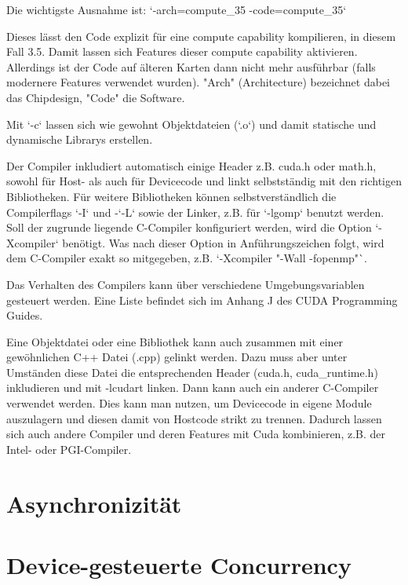 		Die wichtigste Ausnahme ist: \li`-arch=compute_35 -code=compute_35`
		
		Dieses lässt den Code explizit für eine \gls{compute capability} kompilieren, in diesem Fall 3.5. Damit lassen sich Features dieser \gls{compute capability} aktivieren. Allerdings ist der Code auf älteren Karten dann nicht mehr ausführbar (falls modernere Features verwendet wurden). "Arch" (Architecture) bezeichnet dabei das Chipdesign, "Code" die Software.
		
		Mit \li`-c` lassen sich wie gewohnt Objektdateien (\li`.o`) und damit statische und dynamische Librarys erstellen.
		
		Der Compiler inkludiert automatisch einige Header z.B. cuda.h oder math.h, sowohl für Host- als auch für Devicecode und linkt selbstständig mit den richtigen Bibliotheken. Für weitere Bibliotheken können selbstverständlich die Compilerflags \li`-I` und -\li`-L` sowie der Linker, z.B. für \li`-lgomp` benutzt werden.
		Soll der zugrunde liegende C-Compiler konfiguriert werden, wird die Option \li`-Xcompiler` benötigt. Was nach dieser Option in Anführungszeichen folgt, wird dem C-Compiler exakt so mitgegeben, z.B. \li`-Xcompiler "-Wall -fopenmp"`.
		
		Das Verhalten des Compilers kann über verschiedene Umgebungsvariablen gesteuert werden. Eine Liste befindet sich im Anhang J des CUDA Programming Guides. \autocite{cudaPG} 
		
		Eine Objektdatei oder eine Bibliothek kann auch zusammen mit einer gewöhnlichen C++ Datei (.cpp) gelinkt werden. Dazu muss aber unter Umständen diese Datei die entsprechenden Header (cuda.h, cuda{\_}runtime.h) inkludieren und mit -lcudart linken. Dann kann auch ein anderer C-Compiler verwendet werden. Dies kann man nutzen, um Devicecode in eigene Module auszulagern und diesen damit von Hostcode strikt zu trennen. Dadurch lassen sich auch andere Compiler und deren Features mit Cuda kombinieren, z.B. der Intel- oder PGI-Compiler.
		
		\section{Asynchronizit\"at}\label{async}
		\section{Device-gesteuerte Concurrency}\label{conc}